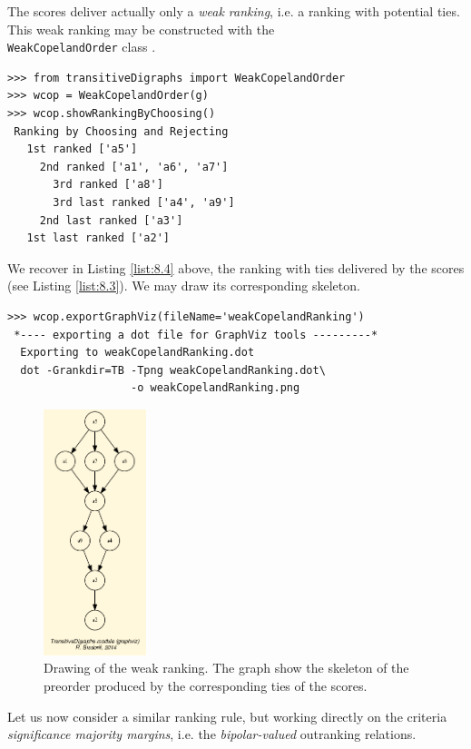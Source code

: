 The \Copeland scores deliver actually only a \emph{weak ranking}, i.e. a ranking with potential ties. This weak ranking may be constructed with the\\
\texttt{WeakCopelandOrder} class .
\begin{lstlisting}[caption={Computing a weak \Copeland ranking},label=list:8.4]
>>> from transitiveDigraphs import WeakCopelandOrder
>>> wcop = WeakCopelandOrder(g)
>>> wcop.showRankingByChoosing()
 Ranking by Choosing and Rejecting
   1st ranked ['a5']
     2nd ranked ['a1', 'a6', 'a7']
       3rd ranked ['a8']
       3rd last ranked ['a4', 'a9']
     2nd last ranked ['a3']
   1st last ranked ['a2']
\end{lstlisting}
We recover in Listing \ref{list:8.4} above, the ranking with ties delivered by the \Copeland scores (see Listing \ref{list:8.3}). We may draw its corresponding skeleton.
\begin{lstlisting}
>>> wcop.exportGraphViz(fileName='weakCopelandRanking')
 *---- exporting a dot file for GraphViz tools ---------*
  Exporting to weakCopelandRanking.dot
  dot -Grankdir=TB -Tpng weakCopelandRanking.dot\
                   -o weakCopelandRanking.png
\end{lstlisting}
\begin{figure}[h]
\sidecaption[t]
\includegraphics[width=3cm]{Figures/weakCopelandRanking.png}
\caption{Drawing of the weak \Copeland ranking. The graph show the skeleton of the preorder produced by the corresponding ties of the \Copeland scores.}
\label{fig:8.2}       %
\end{figure}

Let us now consider a similar ranking rule, but working directly on the criteria \emph{significance majority margins}, i.e. the \emph{bipolar-valued} outranking relations.

